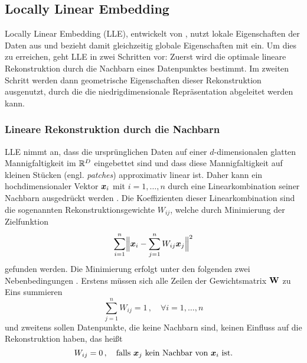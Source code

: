 \subsection{Locally Linear Embedding}
\label{ch:MethodenDerDimRed:statistisch:LLE}
Locally Linear Embedding (LLE), entwickelt von \textcite{Roweis.2000}, nutzt lokale Eigenschaften der Daten aus und bezieht damit gleichzeitig globale Eigenschaften mit ein. Um dies zu erreichen, geht LLE in zwei Schritten vor: Zuerst wird die optimale lineare Rekonstruktion durch die Nachbarn eines Datenpunktes bestimmt. Im zweiten Schritt werden dann geometrische Eigenschaften dieser Rekonstruktion ausgenutzt, durch die die niedrigdimensionale Repräsentation abgeleitet werden kann.

\subsubsection{Lineare Rekonstruktion durch die Nachbarn}
\label{ch:MethodenDerDimRed:statistisch:LLE:LineareRekonstruktion}
LLE nimmt an, dass die ursprünglichen Daten auf einer $d$-dimensionalen glatten Mannigfaltigkeit im $\mathbb{R}^D$ eingebettet sind und dass diese Mannigfaltigkeit auf kleinen Stücken (engl. \textit{patches}) approximativ linear ist. Daher kann ein hochdimensionaler Vektor $\bm{x}_i$ mit $i = 1,\ldots,n$ durch eine Linearkombination seiner Nachbarn
ausgedrückt werden \parencite[2323]{Roweis.2000}. Die Koeffizienten dieser Linearkombination sind die sogenannten
Rekonstruktionsgewichte $W_{ij}$, welche durch Minimierung der Zielfunktion
\begin{equation}
	\label{eq:LLE:Zielfunktion}
	\sum_{i = 1}^n \norm[\Big]{ \vect{x}_i - \sum_{j = 1}^n W_{ij}\vect{x}_j}^2
\end{equation}
gefunden werden. Die Minimierung erfolgt unter den folgenden zwei Nebenbedingungen \parencite[2]{Roweis.2000}. Erstens müssen sich alle Zeilen der Gewichtsmatrix $\mathbf{W}$ zu Eins
summieren
\begin{equation}
	\label{eq:LLE:ErsteNebenbedingung}
	\sum_{j = 1}^nW_{ij} = 1 \, , \quad \forall i = 1, \ldots, n
\end{equation}
und zweitens sollen Datenpunkte, die keine Nachbarn sind, keinen Einfluss auf die Rekonstruktion haben, das heißt
\begin{equation}
	\label{eq:LLE:ZweiteNebenbedingung}
	W_{ij} = 0 \, , \quad \text{falls } \vect{x}_j \text{ kein Nachbar von } \vect{x}_i \text{ ist.}
\end{equation}
